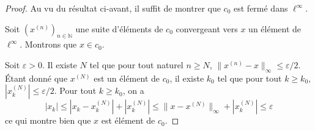 \begin{proof}
  Au vu du résultat ci-avant, il suffit de montrer que $c_0$ est
  fermé dans $\ell^\infty$.

  Soit $(x^{(n)})_{n\in\mathbb N}$ une suite d'éléments de $c_0$
  convergeant vers $x$ un élément de $\ell^\infty$. Montrons que
  $x\in c_0$.

  Soit $\varepsilon > 0$. Il existe $N$ tel que pour tout naturel $n\geq N$,
  $\|x^{(n)}-x\|_\infty\leq \varepsilon/2$. \'{E}tant donné que $x^{(N)}$
  est un élément de $c_0$, il existe $k_0$ tel que pour tout $k\geq k_0$,
  $|x^{(N)}_k|\leq \varepsilon /2$. Pour tout $k\geq k_0$, on a
  $$|x_k|\leq |x_k - x^{(N)}_k| + |x^{(N)}_k|
  \leq \|x - x^{(N)}\|_\infty + |x^{(N)}_k| \leq \varepsilon$$
  ce qui montre bien que $x$ est élément de $c_0$.
\end{proof}



